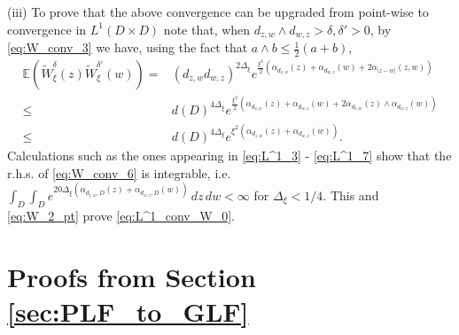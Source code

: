 \documentclass[a4paper, 11pt, reqno]{amsart}
\theoremstyle{definition} \newtheorem{defn}{Definition}[section]
\theoremstyle{remark} \newtheorem{rem}[defn]{Remark}
\theoremstyle{remark} \newtheorem*{rem*}{Remark}
\theoremstyle{plain} \newtheorem{thm}[defn]{Theorem}
\theoremstyle{plain} \newtheorem{lem}[defn]{Lemma}
\theoremstyle{plain} \newtheorem{prop}[defn]{Proposition}
\theoremstyle{plain} \newtheorem{cor}[defn]{Corollary}
\theoremstyle{remark} \newtheorem{exm}[defn]{\textbf{Example}}
\theoremstyle{remark} \newtheorem{exms}[defn]{\textbf{Examples}}
\theoremstyle{remark} \newtheorem*{bl}{}
\numberwithin{equation}{section} %
\newcommand{\x}{\times}
\newcommand{\E}{\mathbb{E}}
\begin{document}
		(iii) To prove that the above convergence can be upgraded from point-wise to convergence in $L^1(D\x D)$ note that, when $d_{z,w}\wedge d_{w,z}>\delta, \delta'>0$, by \eqref{eq:W_conv_3} we have, using the fact that $a\wedge b \le \frac{1}{2}(a+b)$,
		\begin{align}\label{eq:W_conv_6}
			 \E (\tilde{W}^{\delta}_{\xi}(z) \tilde{W}^{\delta'}_{\xi}(w)) 
			=& (d_{z,w}d_{w,z})^{2\Delta_{\xi}} e^{\frac{\xi^2}{2} \left( \alpha_{d_{z,w}}(z) + \alpha_{d_{w,z}}(w)+ 2 \alpha_{|z-w|}(z,w) \right)}
			\nonumber \\
			\le & d(D)^{4\Delta_{\xi}} e^{ \frac{\xi^2}{2} \left( \alpha_{d_{z,w}}(z) + \alpha_{d_{w,z}}(w)+ 2 \alpha_{d_{z,w}}(z)\wedge  \alpha_{d_{w,z}}(w) \right)}
			\nonumber \\
			\le & d(D)^{4\Delta_{\xi}} e^{\xi^2 \left( \alpha_{d_{z,w}}(z) + \alpha_{d_{w,z}}(w)\right)}.
		\end{align}
		Calculations such as the ones appearing in \eqref{eq:L^1_3} - \eqref{eq:L^1_7} show that the r.h.s. of \eqref{eq:W_conv_6} is integrable, i.e. $\int_D \int_D e^{20\Delta_{\xi} \left( \alpha_{d_{z,w},D}(z) + \alpha_{d_{w,z}, D}(w)\right)} \, dz \, dw < \infty$
		for $\Delta_{\xi} < 1/4$. This and \eqref{eq:W_2_pt} prove \eqref{eq:L^1_conv_W_0}.    
    

    \section{Proofs from Section \ref{sec:PLF_to_GLF}} \label{app:proofs_PLF_to_GLF}

		
	    
\end{document}
